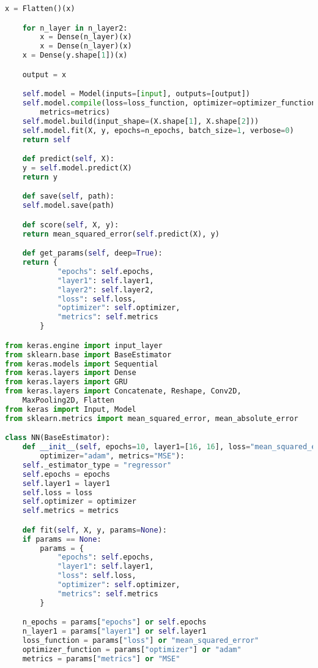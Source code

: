 \begin{lstlisting}[label=python-listing,caption={Kod źródłowy},language=python]
    x = Flatten()(x)

    for n_layer in n_layer2:
        x = Dense(n_layer)(x)
        x = Dense(n_layer)(x)
    x = Dense(y.shape[1])(x)

    output = x

    self.model = Model(inputs=[input], outputs=[output])
    self.model.compile(loss=loss_function, optimizer=optimizer_function, 
        metrics=metrics) 
    self.model.build(input_shape=(X.shape[1], X.shape[2]))
    self.model.fit(X, y, epochs=n_epochs, batch_size=1, verbose=0)
    return self

    def predict(self, X):
    y = self.model.predict(X)
    return y

    def save(self, path):
    self.model.save(path)

    def score(self, X, y):
    return mean_squared_error(self.predict(X), y)

    def get_params(self, deep=True):
    return {
            "epochs": self.epochs,
            "layer1": self.layer1,
            "layer2": self.layer2,
            "loss": self.loss,
            "optimizer": self.optimizer,
            "metrics": self.metrics
        }

from keras.engine import input_layer
from sklearn.base import BaseEstimator
from keras.models import Sequential 
from keras.layers import Dense 
from keras.layers import GRU
from keras.layers import Concatenate, Reshape, Conv2D, 
    MaxPooling2D, Flatten
from keras import Input, Model
from sklearn.metrics import mean_squared_error, mean_absolute_error

class NN(BaseEstimator):
    def __init__(self, epochs=10, layer1=[16, 16], loss="mean_squared_error", 
        optimizer="adam", metrics="MSE"):
    self._estimator_type = "regressor"
    self.epochs = epochs
    self.layer1 = layer1
    self.loss = loss
    self.optimizer = optimizer
    self.metrics = metrics

    def fit(self, X, y, params=None):
    if params == None:
        params = {
            "epochs": self.epochs,
            "layer1": self.layer1,
            "loss": self.loss,
            "optimizer": self.optimizer,
            "metrics": self.metrics
        }

    n_epochs = params["epochs"] or self.epochs
    n_layer1 = params["layer1"] or self.layer1
    loss_function = params["loss"] or "mean_squared_error"
    optimizer_function = params["optimizer"] or "adam"
    metrics = params["metrics"] or "MSE"


\end{lstlisting}

